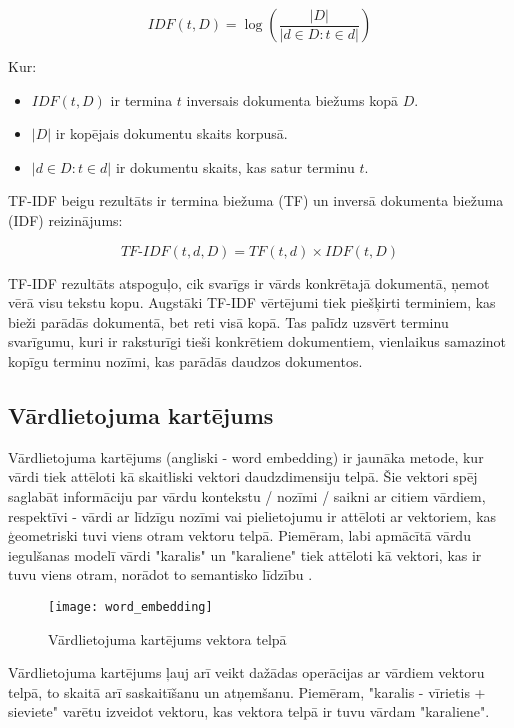 \begin{equation}
IDF(t, D) = \log\left(\frac{|D|}{|{d \in D : t \in d}|}\right)
\end{equation}

\noindent Kur:
\begin{itemize}
\item \(IDF(t, D)\) ir termina \(t\) inversais dokumenta biežums kopā \(D\).
\item \(|D|\) ir kopējais dokumentu skaits korpusā.
\item \(|{d \in D : t \in d}|\) ir dokumentu skaits, kas satur terminu \(t\).
\end{itemize}

TF-IDF beigu rezultāts ir termina biežuma (TF) un inversā dokumenta biežuma (IDF) reizinājums:

\begin{equation}
TF\text{-}IDF(t, d, D) = TF(t, d) \times IDF(t, D)
\end{equation}

TF-IDF rezultāts atspoguļo, cik svarīgs ir vārds konkrētajā dokumentā, ņemot vērā visu tekstu kopu. Augstāki TF-IDF vērtējumi tiek piešķirti terminiem, kas bieži parādās dokumentā, bet reti visā kopā. Tas palīdz uzsvērt terminu svarīgumu, kuri ir raksturīgi tieši konkrētiem dokumentiem, vienlaikus samazinot kopīgu terminu nozīmi, kas parādās daudzos dokumentos.

\subsection{Vārdlietojuma kartējums}
Vārdlietojuma kartējums (angliski - word embedding) ir jaunāka metode, kur vārdi tiek attēloti kā skaitliski vektori daudzdimensiju telpā. Šie vektori spēj saglabāt informāciju par vārdu kontekstu / nozīmi / saikni ar citiem vārdiem, respektīvi -  vārdi ar līdzīgu nozīmi vai pielietojumu ir attēloti ar vektoriem, kas ģeometriski tuvi viens otram vektoru telpā. Piemēram, labi apmācītā vārdu iegulšanas modelī vārdi "karalis" un "karaliene" tiek attēloti kā vektori, kas ir tuvu viens otram, norādot to semantisko līdzību \cite{BaeldungEmbedding}.

\begin{figure}[H]
	\texttt{[image: word\_embedding]}
	\caption{Vārdlietojuma kartējums vektora telpā \cite{BaeldungEmbedding} }
	\label{fig:wordembedding}
\end{figure}

Vārdlietojuma kartējums ļauj arī veikt dažādas operācijas ar vārdiem vektoru telpā, to skaitā arī  saskaitīšanu un atņemšanu. Piemēram, "karalis - vīrietis + sieviete" varētu izveidot vektoru, kas vektora telpā ir tuvu vārdam "karaliene".

